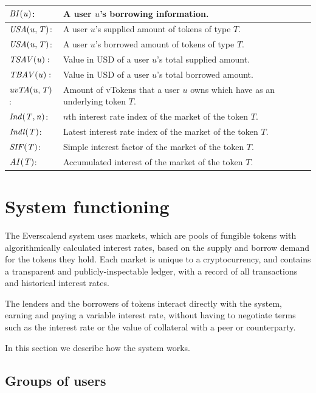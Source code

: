 \begin{tabularx}{\linewidth}{|l X|}
  $\mathit{BI(u)}$: & A user $u$'s borrowing information. \\\hline
  
  $\mathit{USA(u, T)}$: & A user $u$'s supplied amount of tokens of type $T$. \\\hline
  $\mathit{USA(u, T)}$: & A user $u$'s borrowed amount of tokens of type $T$. \\\hline
  
  $\mathit{TSAV(u)}:$ & Value in USD of a user $u$'s total supplied amount. \\\hline
  $\mathit{TBAV(u)}:$ & Value in USD of a user $u$'s total borrowed amount. \\\hline
  $\mathit{uvTA(u, T)}$: & Amount of vTokens that a user $u$ owns which have as an underlying token $T$. \\\hline

  $\mathit{Ind(T, n)}$: & $n$th interest rate index of the market of the token $T$. \\\hline
  $\mathit{Indl(T)}$: & Latest interest rate index of the market of the token $T$. \\\hline
  $\mathit{SIF(T)}$: & Simple interest factor of the market of the token $T$. \\\hline
  $\mathit{AI(T)}$: & Accumulated interest of the market of the token $T$. \\\hline

\end{tabularx}
\newpage
\section{System functioning}

The Everscalend system uses markets, which are pools of fungible tokens with algorithmically calculated interest rates, based on the supply and borrow demand for the tokens they hold. Each market is unique to a cryptocurrency, and contains a transparent and publicly-inspectable ledger, with a record of all transactions and historical interest rates.

The lenders and the borrowers of tokens interact directly with the system, earning and paying a variable interest rate, without having to negotiate terms such as the interest rate or the value of collateral with a peer or counterparty.

In this section we describe how the system works.

\subsection{Groups of users}

